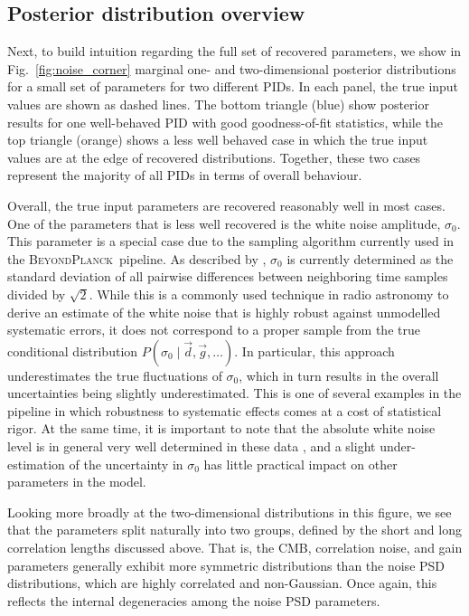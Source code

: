 \documentclass[twocolumn]{aa}%
\renewcommand{\d}[0]{\vec{d}}
\newcommand{\g}[0]{\vec{g}}
\newcommand{\BP}{\textsc{BeyondPlanck}}
\begin{document}
\subsection{Posterior distribution overview}

Next, to build intuition regarding the full set of recovered
parameters, we show in Fig.~\ref{fig:noise_corner} marginal one- and
two-dimensional posterior distributions for a small set of parameters
for two different PIDs. In each panel, the true input values are shown
as dashed lines. The bottom triangle (blue) show posterior results
for one well-behaved PID with good goodness-of-fit statistics, while
the top triangle (orange) shows a less well behaved case in
which the true input values are at the edge of recovered
distributions. Together, these two cases represent the majority of
all PIDs in terms of overall behaviour.

Overall, the true input parameters are recovered reasonably well in
most cases. One of the parameters that is less well recovered is the
white noise amplitude, $\sigma_0$. This parameter is a special case
due to the sampling algorithm currently used in the \BP\ pipeline. As
described by \citet{bp06}, $\sigma_0$ is currently determined as the
standard deviation of all pairwise differences between neighboring
time samples divided by $\sqrt{2}$. While this is a commonly used
technique in radio astronomy to derive an estimate of the white noise
that is highly robust against unmodelled systematic errors, it does
not correspond to a proper sample from the true conditional
distribution $P(\sigma_0\mid\d, \g, \ldots)$. In particular, this approach underestimates the true fluctuations of $\sigma_0$, which in turn results in the overall uncertainties being slightly underestimated.
 This is one of several examples in the pipeline in
which robustness to systematic effects comes at a cost of statistical
rigor. At the same time, it is important to note that the absolute
white noise level is in general very well determined in these data
\citep{bp06}, and a slight under-estimation of the uncertainty in
$\sigma_0$ has little practical impact on other parameters in the
model. 

Looking more broadly at the two-dimensional distributions in this
figure, we see that the parameters split naturally into two groups,
defined by the short and long correlation lengths discussed
above. That is, the CMB, correlation noise, and gain parameters
generally exhibit more symmetric distributions than the noise PSD
distributions, which are highly correlated and non-Gaussian. Once
again, this reflects the internal degeneracies among the noise PSD
parameters.
\end{document}
